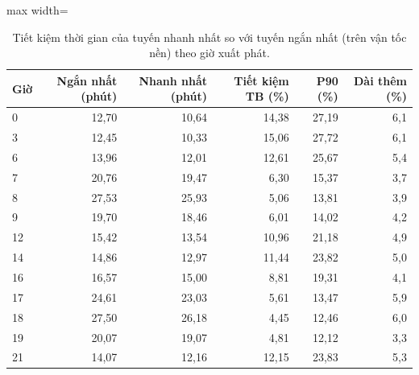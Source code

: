 \begin{table}[!htbp]
\centering
\small
\caption{Tiết kiệm thời gian của tuyến nhanh nhất so với tuyến ngắn nhất (trên vận tốc nền) theo giờ xuất phát.}
\label{tab:tab_saving_by_hour}
\begin{adjustbox}{max width=\linewidth}
\begin{tabular}{lrrrrr}
\toprule
Giờ & Ngắn nhất (phút) & Nhanh nhất (phút) & Tiết kiệm TB (\%) & P90 (\%) & Dài thêm (\%) \\
\midrule
0 & 12{,}70 & 10{,}64 & 14{,}38 & 27{,}19 & 6{,}1 \\
3 & 12{,}45 & 10{,}33 & 15{,}06 & 27{,}72 & 6{,}1 \\
6 & 13{,}96 & 12{,}01 & 12{,}61 & 25{,}67 & 5{,}4 \\
7 & 20{,}76 & 19{,}47 & 6{,}30 & 15{,}37 & 3{,}7 \\
8 & 27{,}53 & 25{,}93 & 5{,}06 & 13{,}81 & 3{,}9 \\
9 & 19{,}70 & 18{,}46 & 6{,}01 & 14{,}02 & 4{,}2 \\
12 & 15{,}42 & 13{,}54 & 10{,}96 & 21{,}18 & 4{,}9 \\
14 & 14{,}86 & 12{,}97 & 11{,}44 & 23{,}82 & 5{,}0 \\
16 & 16{,}57 & 15{,}00 & 8{,}81 & 19{,}31 & 4{,}1 \\
17 & 24{,}61 & 23{,}03 & 5{,}61 & 13{,}47 & 5{,}9 \\
18 & 27{,}50 & 26{,}18 & 4{,}45 & 12{,}46 & 6{,}0 \\
19 & 20{,}07 & 19{,}07 & 4{,}81 & 12{,}12 & 3{,}3 \\
21 & 14{,}07 & 12{,}16 & 12{,}15 & 23{,}83 & 5{,}3 \\
\bottomrule
\end{tabular}
\end{adjustbox}
\end{table}
